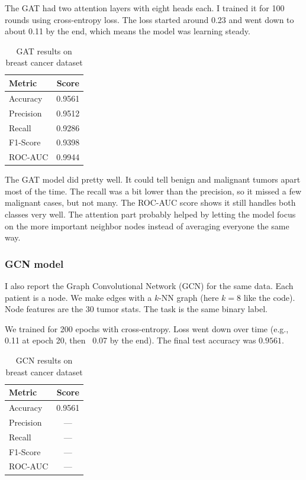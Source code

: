 \documentclass[12pt]{article}
\begin{document}
The GAT had two attention layers with eight heads each. I trained it for 100 rounds using cross-entropy loss. The loss started around 0.23 and went down to about 0.11 by the end, which means the model was learning steady.

\begin{table}[H]
\centering
\caption{GAT results on breast cancer dataset}
\begin{tabular}{|l|c|}
\hline
\textbf{Metric} & \textbf{Score} \\
\hline
Accuracy  & 0.9561 \\
Precision & 0.9512 \\
Recall    & 0.9286 \\
F1-Score  & 0.9398 \\
ROC-AUC   & 0.9944 \\
\hline
\end{tabular}
\end{table}

The GAT model did pretty well. It could tell benign and malignant tumors apart most of the time. The recall was a bit lower than the precision, so it missed a few malignant cases, but not many. The ROC-AUC score shows it still handles both classes very well. The attention part probably helped by letting the model focus on the more important neighbor nodes instead of averaging everyone the same way.

\subsubsection{GCN model}

I also report the Graph Convolutional Network (GCN) for the same data. Each patient is a node. We make edges with a $k$-NN graph (here $k=8$ like the code). Node features are the 30 tumor stats. The task is the same binary label.

We trained for 200 epochs with cross-entropy. Loss went down over time (e.g., 0.11 at epoch 20, then ~0.07 by the end). The final test accuracy was $0.9561$.

\begin{table}[H]
\centering
\caption{GCN results on breast cancer dataset}
\begin{tabular}{|l|c|}
\hline
\textbf{Metric} & \textbf{Score} \\
\hline
Accuracy  & 0.9561 \\
Precision & --- \\
Recall    & --- \\
F1-Score  & --- \\
ROC-AUC   & --- \\
\hline
\end{tabular}
\end{table}
\end{document}
